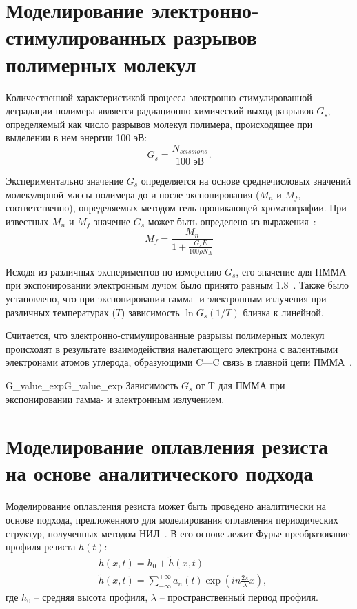\section{Моделирование электронно-стимулированных разрывов полимерных молекул}
Количественной характеристикой процесса электронно-стимулированной деградации полимера является радиационно-химический выход разрывов $G_s$, определяемый как число разрывов молекул полимера, происходящее при выделении в нем энергии 100 эВ:
\begin{equation}
	G_s = \frac{N_{scissions}}{100 \text{ эВ}}.
\end{equation}

Экспериментально значение $G_s$ определяется на основе среднечисловых значений молекулярной массы полимера до и после экспонирования ($M_n$ и $M_f$, соответственно), определяемых методом гель-проникающей хроматографии. При известных $M_n$ и $M_f$ значение $G_s$ может быть определено из выражения~\cite{Greeneich1979_Mf_Mn}:
\begin{equation}
	{M_f = \frac{\displaystyle M_n}{1 + \frac{\displaystyle G_s E}{\displaystyle 100 \rho N_A}}}
\end{equation}

Исходя из различных экспериментов по измерению $G_s$, его значение для ПММА при экспонировании электронным лучом было принято равным 1.8~\cite{Charlesby_1964_Gs}. Также было установлено, что при экспонировании гамма- и электронным излучения при различных температурах ($T$) зависимость $\ln G_s (1/T)$ близка к линейной.

Считается, что электронно-стимулированные разрывы полимерных молекул происходят в результате взаимодействия налетающего электрона с валентными электронами атомов углерода, образующими C---C связь в главной цепи ПММА~\cite{Stepanova_2006}.

\begin{narrowfig}{G_value_exp}{G_value_exp}
	Зависимость $G_s$ от T для ПММА при экспонировании гамма- и электронным излучением.
\end{narrowfig}







\section{Моделирование оплавления резиста на основе аналитического подхода}
Моделирование оплавления резиста может быть проведено аналитически на основе подхода, предложенного для моделирования оплавления периодических структур, полученных методом НИЛ~\cite{Leveder_2008, Leveder_2011}. В его основе лежит Фурье-преобразование профиля резиста $h(t)$:
\begin{equation}
	\begin{aligned}
		& h(x, t) = h_0 + \tilde{h}(x, t) \\
		& \tilde{h}(x, t) = \sum_{-\infty}^{+\infty} a_n(t) \exp \left(i n \frac{2 \pi}{\lambda} x\right),
	\end{aligned}
\end{equation}
где $h_0$ -- средняя высота профиля, $\lambda$ -- пространственный период профиля.

